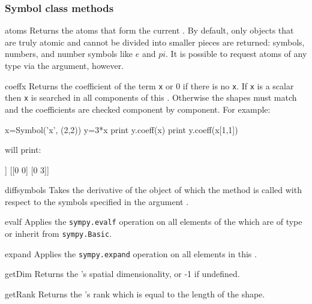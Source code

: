 \subsubsection{Symbol class methods}
\begin{methoddesc}[Symbol]{atoms}{}
Returns the atoms that form the current \SYMBOL.
By default, only objects that are truly atomic and cannot be divided into
smaller pieces are returned: symbols, numbers, and number symbols like $e$ and
$pi$. It is possible to request atoms of any type via the 
argument, however.
\end{methoddesc}

\begin{methoddesc}[Symbol]{coeff}{x }
Returns the coefficient of the term \texttt{x} or $0$ if there is no \texttt{x}.
If \texttt{x} is a scalar \SYMBOL then \texttt{x} is searched in all components
of this \SYMBOL. Otherwise the shapes must match and the coefficients are
checked component by component. For example:
\begin{python}
     x=Symbol('x', (2,2))
     y=3*x
     print y.coeff(x)
     print y.coeff(x[1,1])
\end{python}
will print:
\begin{python}
     [[3 3]
      [3 3]]
     [[0 0]
      [0 3]]
\end{python} 
\end{methoddesc}
\begin{methoddesc}[Symbol]{diff}{symbols}
Takes the derivative of the \SYMBOL object of which the method is called with
respect to the symbols specified in the argument .
\end{methoddesc}
\begin{methoddesc}[Symbol]{evalf}{}
Applies the \texttt{sympy.evalf} operation on all elements of the \SYMBOL which
are of type or inherit from \texttt{sympy.Basic}.
\end{methoddesc}
\begin{methoddesc}[Symbol]{expand}{}
Applies the \texttt{sympy.expand} operation on all elements in this \SYMBOL.
\end{methoddesc}
\begin{methoddesc}[Symbol]{getDim}{}
Returns the \SYMBOL's spatial dimensionality, or -1 if undefined.
\end{methoddesc}
\begin{methoddesc}[Symbol]{getRank}{}
Returns the \SYMBOL's rank which is equal to the length of the shape.
\end{methoddesc}
